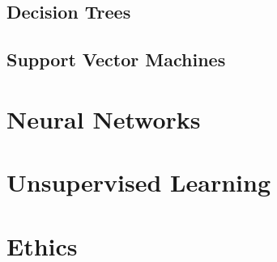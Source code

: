 \documentclass[12pt, a4paper]{article}
\begin{document}
\begin{multicols*}{3}
\subsection{Decision Trees}
\subsection{Support Vector Machines}

\section{Neural Networks}

\section{Unsupervised Learning}

\section{Ethics}
\end{multicols*}
\end{document}
